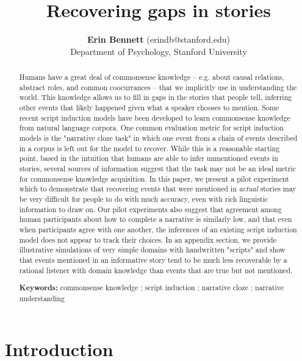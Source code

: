 \documentclass[10pt,a4paper]{article}
\title{Recovering gaps in stories}
\author{{\large \bf Erin Bennett} (erindb@stanford.edu) \\ %
  Department of Psychology, Stanford University}
\begin{document}
\maketitle


\begin{abstract}

Humans have a great deal of commonsense knowledge -- e.g. about causal relations, abstract roles, and common coocurrances -- that we implicitly use in understanding the world.
This knowledge allows us to fill in gaps in the stories that people tell, inferring other events that likely happened given what a speaker chooses to mention.
Some recent script induction models have been developed to learn commonsense knowledge from natural language corpora.
One common evaluation metric for script induction models is the "narrative cloze task" in which one event from a chain of events described in a corpus is left out for the model to recover.
While this is a reasonable starting point, based in the intuition that humans are able to infer unmentioned events in stories, several sources of information suggest that the task may not be an ideal metric for commonsense knowledge acquisition.
In this paper, we present a pilot experiment which to demonstrate that recovering events that were mentioned in {\em actual} stories may be very difficult for people to do with much accuracy, even with rich linguistic information to draw on.
Our pilot experiments also suggest that agreement among human participants about how to complete a narrative is similarly low, and that even when participants agree with one another, the inferences of an existing script induction model does not appear to track their choices.
In an appendix section, we provide illustrative simulations of very simple domains with handwritten "scripts" and show that events mentioned in an informative story tend to be much less recoverable by a rational listener with domain knowledge than events that are true but not mentioned.

\textbf{Keywords:} 
commonsense knowledge ; script induction ; narrative cloze ; narrative understanding
\end{abstract}

\section{Introduction}
\end{document}
